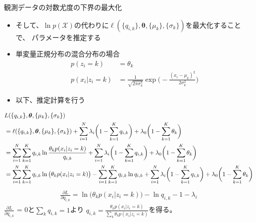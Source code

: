 \documentclass[aspectratio=169,unicode,dvipdfmx,14pt]{beamer}
\begin{document}
\begin{frame}{観測データの対数尤度の下界の最大化}
\begin{itemize}
\item そして、$\ln p(\mathcal{X})$の代わりに$\ell(\{q_{i,k}\},\bm{\theta},\{\mu_k\},\{\sigma_k\})$を最大化することで、
パラメータを推定する
\item 単変量正規分布の混合分布の場合
\begin{align}
p(z_i=k) & = \theta_k \\
p(x_i | z_i=k) & = \frac{1}{\sqrt{2\pi\sigma_k^2}} \exp \bigg( - \frac{ ( x_i - \mu_k)^2 }{ 2\sigma_k^2 } \bigg)
\end{align}
\item 以下、推定計算を行う
\end{itemize}
\end{frame}

\begin{frame}
\FontMath
\begin{align}
& L(\{q_{i,k}\},\bm{\theta},\{\mu_k\},\{\sigma_k\}) 
\notag \\ &
= \ell(\{q_{i,k}\},\bm{\theta},\{\mu_k\},\{\sigma_k\})
+ \sum_{i=1}^N \lambda_i \bigg(1 - \sum_{k=1}^K q_{i,k}\bigg)
+ \lambda_0 \bigg( 1 - \sum_{k=1}^K \theta_k \bigg)
\notag \\ &
= \sum_{i=1}^N \sum_{k=1}^K q_{i,k} \ln\frac{\theta_k p(x_i | z_i = k)}{q_{i,k}}
+ \sum_{i=1}^N \lambda_i \bigg(1 - \sum_{k=1}^K q_{i,k}\bigg)
+ \lambda_0 \bigg( 1 - \sum_{k=1}^K \theta_k \bigg)
\notag \\ &
= 
\sum_{i=1}^N \sum_{k=1}^K q_{i,k} \ln \big( \theta_k p(x_i | z_i = k) \big)
- \sum_{i=1}^N \sum_{k=1}^K q_{i,k} \ln q_{i,k}
+ \sum_{i=1}^N \lambda_i \bigg(1 - \sum_{k=1}^K q_{i,k}\bigg)
+ \lambda_0 \bigg( 1 - \sum_{k=1}^K \theta_k \bigg)
\end{align}
\begin{align}
\frac{\partial L}{\partial q_{i,k}}
= \ln \big( \theta_k p(x_i | z_i = k) \big) - \ln q_{i,k} - 1 - \lambda_i
\end{align}
$\frac{\partial L}{\partial q_{i,k}}$ = 0と$\sum_k q_{i,k}=1$より
$q_{i,k} = \frac{ \theta_k p(x_i | z_i = k) }{ \sum_k \theta_k p(x_i | z_i = k) }$を得る。
\end{frame}
\end{document}
